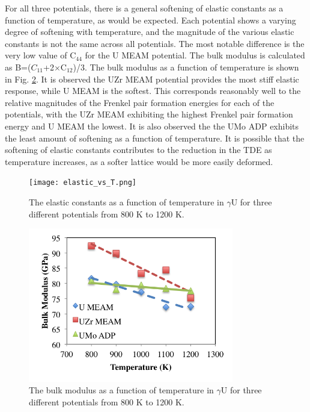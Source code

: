 \documentclass[review]{elsarticle}
\begin{document}
For all three potentials, there is a general softening of elastic constants as a function of temperature, as would be expected. Each potential shows a varying degree of softening with temperature, and the magnitude of the various elastic constants is not the same across all potentials. The most notable difference is the very low value of C$_{44}$ for the U MEAM potential. The bulk modulus is calculated as B=($C_{11}$+2$\times$C$_{12}$)/3. The bulk modulus as a function of temperature is shown in Fig. \ref{fig:bulk}. It is observed the UZr MEAM potential provides the most stiff elastic response, while U MEAM is the softest. This corresponds reasonably well to the relative magnitudes of the Frenkel pair formation energies for each of the potentials, with the UZr MEAM exhibiting the highest Frenkel pair formation energy and U MEAM the lowest. It is also observed the the UMo ADP exhibits the least amount of softening as a function of temperature. It is possible that the softening of elastic constants contributes to the reduction in the TDE as temperature increases, as a softer lattice would be more easily deformed.  


\begin{figure}[h]
 \centering
 \texttt{[image: elastic\_vs\_T.png]} %
 \caption{The elastic constants as a function of temperature in $\gamma$U for three different potentials from 800 K to 1200 K.}
 \label{fig:elastic}
\end{figure}

\begin{figure}[h]
 \centering
 \includegraphics[width=0.8\textwidth]{bulk_vs_Ta.png} %
 \caption{The bulk modulus as a function of temperature in $\gamma$U for three different potentials from 800 K to 1200 K.}
 \label{fig:bulk}
\end{figure}
\end{document}
